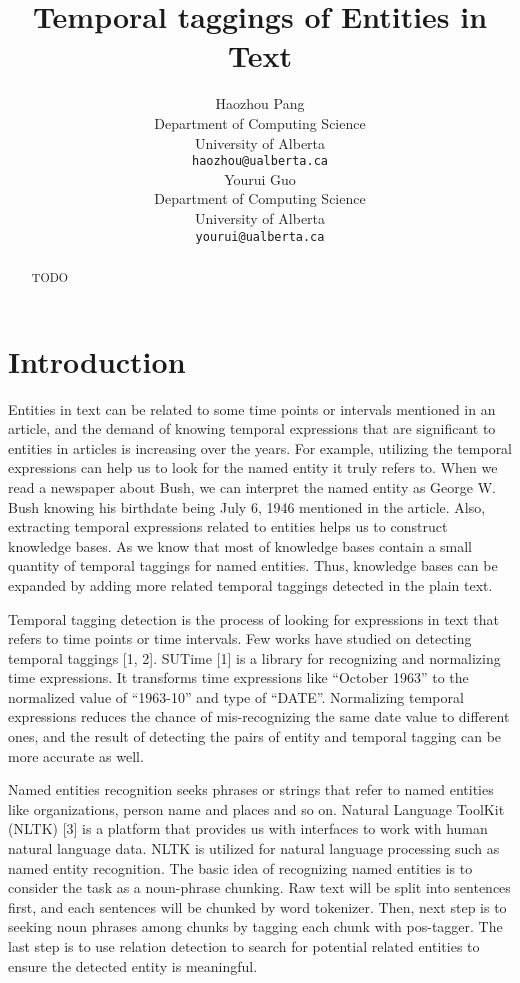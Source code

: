 \documentclass[11pt,a4paper]{article}
\title{Temporal taggings of Entities in Text }
\author{Haozhou Pang \\
  Department of Computing Science \\
  University of Alberta\\
  {\tt haozhou@ualberta.ca} \\\And
 Yourui Guo\\
  Department of Computing Science \\
  University of Alberta\\
  {\tt yourui@ualberta.ca} \\}
\date{}
\begin{document}
\maketitle

\begin{abstract}
TODO

\end{abstract}


\section{Introduction}
 Entities in text can be related to some time points or intervals mentioned in an article, and the demand of knowing temporal expressions that are significant to entities in articles is increasing over the years. For example, utilizing the temporal expressions can help us to look for the named entity it truly refers to. When we read a newspaper about Bush, we can interpret the named entity as George W. Bush knowing his birthdate being July 6, 1946 mentioned in the article. Also, extracting temporal expressions related to entities helps us to construct knowledge bases. As we know that most of knowledge bases contain a small quantity of temporal taggings for named entities. Thus, knowledge bases can be expanded by adding more related temporal taggings detected in the plain text.

Temporal tagging detection is the process of looking for expressions in text that refers to time points or time intervals. Few works have studied on detecting temporal taggings [1, 2]. SUTime [1] is a library for recognizing and normalizing time expressions. It transforms time expressions like “October 1963” to the normalized value of “1963-10” and type of “DATE”. Normalizing temporal expressions reduces the chance of mis-recognizing the same date value to different ones, and the result of detecting the pairs of entity and temporal tagging can be more accurate as well.

Named entities recognition seeks phrases or strings that refer to named entities like organizations, person name and places and so on. Natural Language ToolKit (NLTK) [3] is a platform that provides us with interfaces to work with human natural language data. NLTK is utilized for natural language processing such as named entity recognition. The basic idea of recognizing named entities is to consider the task as a noun-phrase chunking. Raw text will be split into sentences first, and each sentences will be chunked by word tokenizer. Then, next step is to seeking noun phrases among chunks by tagging each chunk with pos-tagger. The last step is to use relation detection to search for potential related entities to ensure the detected entity is meaningful.
\end{document}
